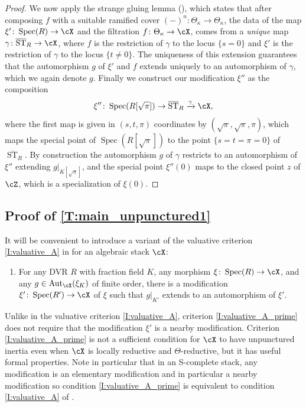 \documentclass[a4paper]{amsart}
\numberwithin{equation}{section}
\theoremstyle{plain}
\theoremstyle{definition}
\DeclareMathOperator{\Spec}{Spec}
\DeclareMathOperator{\ST}{ST}
\DeclareMathOperator{\Aut}{Aut}
\newcommand{\co}{\colon}
\def\oST{\overline{\ST}}
\begin{document}
\begin{proof}
We now apply the strange gluing lemma (), which states that after composing $f$ with a suitable ramified cover $(-)^n \co \Theta_\kappa \to \Theta_\kappa$, the data of the map $\xi' \co \Spec(R) \to \cX$ and the filtration $f \co \Theta_\kappa \to \cX$, comes from a \emph{unique} map $\gamma\co \oST_{R} \to \cX$, where $f$ is the restriction of $\gamma$ to the locus $\{s=0\}$ and $\xi'$ is the restriction of $\gamma$ to the locus $\{t \neq 0\}$. The uniqueness of this extension guarantees that the automorphism $g$ of $\xi'$ and $f$ extends uniquely to an automorphism of $\gamma$, which we again denote $g$. Finally we construct our modification $\xi''$ as the composition
\[
\xi'' \co  \Spec(R[\sqrt{\pi}]) \to \oST_{R} \xrightarrow{\gamma} \cX,
\]
where the first map is given in $(s,t,\pi)$ coordinates by $(\sqrt{\pi},\sqrt{\pi},\pi)$, which maps the special point of $\Spec(R[\sqrt{\pi}])$ to the point $\{s=t=\pi=0\}$ of $\oST_R$. By construction the automorphism $g$ of $\gamma$ restricts to an automorphism of $\xi''$ extending $g|_{K[\sqrt{\pi}]}$, and the special point $\xi''(0)$ maps to the closed point $z$ of $\cZ$, which is a specialization of $\xi(0)$.
\end{proof}

\subsection{Proof of \texorpdfstring{\eqref{T:main_unpunctured1}}{Theorem}}
It will be convenient to introduce a variant of the valuative criterion \eqref{I:valuative_A} in  for an algebraic stack $\cX$:
\begin{enumerate}[label=(\arabic*$'$)]
\item For any DVR $R$ with fraction field $K$, any morphism $\xi \co \Spec(R) \to \cX$, and any $g \in \Aut_\cX(\xi_K)$ of finite order, there is a modification $\xi' \co \Spec(R') \to \cX$ of $\xi$ such that $g|_{K'}$ extends to an automorphism of $\xi'$. \label{I:valuative_A_prime}
\end{enumerate}
Unlike in the valuative criterion \eqref{I:valuative_A}, criterion \ref{I:valuative_A_prime} does not require that the modification $\xi'$ is a nearby modification. Criterion \ref{I:valuative_A_prime} is not a sufficient condition for $\cX$ to have unpunctured inertia even when $\cX$ is locally reductive and $\Theta$-reductive, but it has useful formal properties. Note in particular that in an  {\textsf{S}}-complete stack, any modification is an elementary modification and in particular a nearby modification so condition \ref{I:valuative_A_prime} is equivalent to condition \eqref{I:valuative_A} of .
\end{document}
